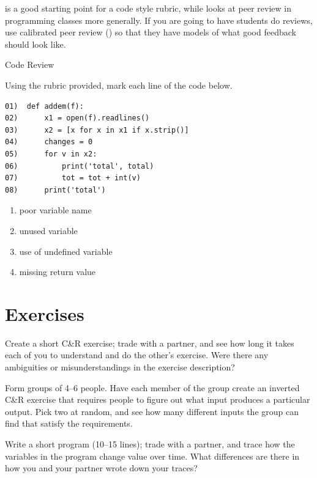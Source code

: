\cite{Steg2016b} is a good starting point for a code style rubric,
while \cite{Luxt2009} looks at peer review in programming classes more
generally.  If you are going to have students do reviews, use
calibrated peer review () so that they have
models of what good feedback should look like.

\begin{callout}{Code Review}

  Using the rubric provided, mark each line of the code below.

\begin{verbatim}
01)  def addem(f):
02)      x1 = open(f).readlines()
03)      x2 = [x for x in x1 if x.strip()]
04)      changes = 0
05)      for v in x2:
06)          print('total', total)
07)          tot = tot + int(v)
08)      print('total')
\end{verbatim}

\begin{enumerate}
\item
  poor variable name
\item
  unused variable
\item
  use of undefined variable
\item
  missing return value
\end{enumerate}

\end{callout}

\section{Exercises}\label{s:exercises-exercises}


Create a short C\&R exercise; trade with a partner, and see how long
it takes each of you to understand and do the other's exercise.  Were
there any ambiguities or misunderstandings in the exercise
description?


Form groups of 4--6 people.  Have each member of the group create an
inverted C\&R exercise that requires people to figure out what input
produces a particular output.  Pick two at random, and see how many
different inputs the group can find that satisfy the requirements.


Write a short program (10--15 lines); trade with a partner, and trace
how the variables in the program change value over time.  What
differences are there in how you and your partner wrote down your
traces?

